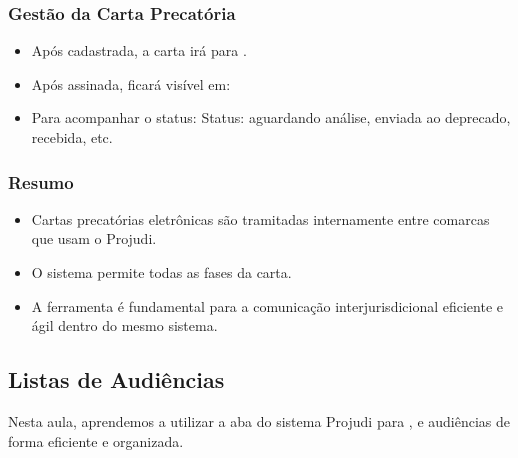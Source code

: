 \documentclass[letterpaper,10pt,brazil]{sphinxmanual}
\begin{document}
\subsubsection{Gestão da Carta Precatória}
\label{\detokenize{projud_44_cartaprecatoriaeletronica:gestao-da-carta-precatoria}}\begin{itemize}
\item {} 
\sphinxAtStartPar
Após cadastrada, a carta irá para .

\item {} 
\sphinxAtStartPar
Após assinada, ficará visível em:
\sphinxhyphen{} 

\item {} 
\sphinxAtStartPar
Para acompanhar o status:
\sphinxhyphen{} 
\sphinxhyphen{} Status: aguardando análise, enviada ao deprecado, recebida, etc.

\end{itemize}


\subsubsection{Resumo}
\label{\detokenize{projud_44_cartaprecatoriaeletronica:resumo}}\begin{itemize}
\item {} 
\sphinxAtStartPar
Cartas precatórias eletrônicas são tramitadas internamente entre comarcas que usam o Projudi.

\item {} 
\sphinxAtStartPar
O sistema permite  todas as fases da carta.

\item {} 
\sphinxAtStartPar
A ferramenta é fundamental para a comunicação interjurisdicional eficiente e ágil dentro do mesmo sistema.

\end{itemize}

\sphinxstepscope


\subsection{Listas de Audiências}
\label{\detokenize{projud_45_listasaudiencias:listas-de-audiencias}}\label{\detokenize{projud_45_listasaudiencias::doc}}
\sphinxAtStartPar
Nesta aula, aprendemos a utilizar a aba  do sistema Projudi para ,  e  audiências de forma eficiente e organizada.
\end{document}
